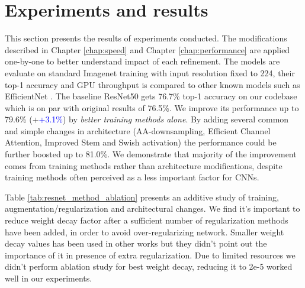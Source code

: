 
% 
\chapter{Experiments and results}


This section presents the results of experiments conducted. The modifications described in Chapter \ref{chap:speed} and Chapter \ref{chap:performance} are applied one-by-one to better understand impact of each refinement. The models are evaluate on standard Imagenet training with input resolution fixed to 224, their top-1 accuracy and GPU throughput is compared to other known models such as EfficientNet \cite{tan2019_efficientnet}. The baseline ResNet50 gets 76.7\% top-1 accuracy on our codebase which is on par with original results of 76.5\%. We improve its performance up to 79.6\% (+\textcolor{blue}{+3.1\%}) by \textit{better training methods alone}. By adding several common and simple changes in architecture (AA-downsampling, Efficient Channel Attention, Improved Stem and Swish activation) the performance could be further boosted up to 81.0\%. We demonstrate that majority of the improvement comes from training methods rather than architecture modifications, despite training methods often perceived as a less important factor for CNNs.  

Table \ref{tab:resnet_method_ablation} presents an additive study of training, augmentation/regularization and architectural changes. We find it's important to reduce weight decay factor after a sufficient number of regularization methods have been added, in order to avoid over-regularizing network. Smaller weight decay values has been used in other works \cite{tan2019_efficientnet} \cite{bello2021_revisiting_resnet} but they didn't point out the importance of it in presence of extra regularization. Due to limited resources we didn't perform ablation study for best weight decay, reducing it to 2e-5 worked well in our experiments.



